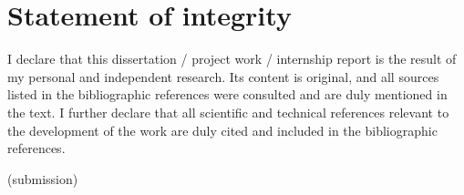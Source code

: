 
%

\chapter{Statement of integrity}

I declare that this dissertation / project work / internship report is the result of my personal and independent research. Its content is original, and all sources listed in the bibliographic references were consulted and are duly mentioned in the text. I further declare that all scientific and technical references relevant to the development of the work are duly cited and included in the bibliographic references.

\bigskip

\begin{center}
   {\GetDocDate(submission)}
\end{center}
